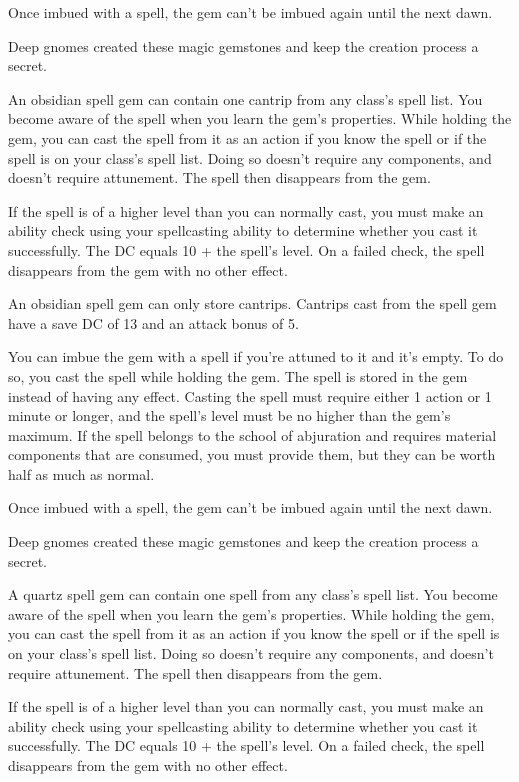 \documentclass[10pt,a4paper,twoside,bg=print,twocolumn,openany,nodeprecatedcode]{dndbook}
\begin{document}
Once imbued with a spell, the gem can't be imbued again until the next dawn.

Deep gnomes created these magic gemstones and keep the creation process a secret.

An obsidian spell gem can contain one cantrip from any class's spell list. You become aware of the spell when you learn the gem's properties. While holding the gem, you can cast the spell from it as an action if you know the spell or if the spell is on your class's spell list. Doing so doesn't require any components, and doesn't require attunement. The spell then disappears from the gem.

If the spell is of a higher level than you can normally cast, you must make an ability check using your spellcasting ability to determine whether you cast it successfully. The DC equals 10 + the spell's level. On a failed check, the spell disappears from the gem with no other effect.

An obsidian spell gem can only store cantrips. Cantrips cast from the spell gem have a save DC of 13 and an attack bonus of 5.

You can imbue the gem with a spell if you're attuned to it and it's empty. To do so, you cast the spell while holding the gem. The spell is stored in the gem instead of having any effect. Casting the spell must require either 1 action or 1 minute or longer, and the spell's level must be no higher than the gem's maximum. If the spell belongs to the school of abjuration and requires material components that are consumed, you must provide them, but they can be worth half as much as normal.

Once imbued with a spell, the gem can't be imbued again until the next dawn.

Deep gnomes created these magic gemstones and keep the creation process a secret.

A quartz spell gem can contain one spell from any class's spell list. You become aware of the spell when you learn the gem's properties. While holding the gem, you can cast the spell from it as an action if you know the spell or if the spell is on your class's spell list. Doing so doesn't require any components, and doesn't require attunement. The spell then disappears from the gem.

If the spell is of a higher level than you can normally cast, you must make an ability check using your spellcasting ability to determine whether you cast it successfully. The DC equals 10 + the spell's level. On a failed check, the spell disappears from the gem with no other effect.
\end{document}
